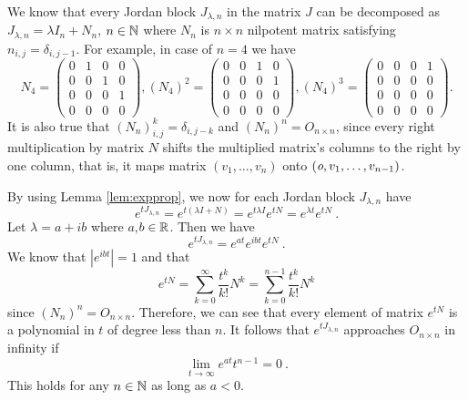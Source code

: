 We know that every Jordan block $J_{\lambda,n}$ in the matrix $J$ can be decomposed as $J_{\lambda,n}=\lambda I_n+N_n$, $n \in\mathbb{N}$ where $N_n$ is $n \times n$ nilpotent matrix satisfying $n_{i,j}=\delta_{i,j-1}$. For example, in case of $n=4$ we have
\begin{equation*}
	N_4=
	\begin{pmatrix}
		0 & 1 & 0 & 0 \\
		0 & 0 & 1 & 0 \\
		0 & 0 & 0 & 1 \\
		0 & 0 & 0 & 0 
	\end{pmatrix},
	(N_4)^2=
	\begin{pmatrix}
		0 & 0 & 1 & 0 \\
		0 & 0 & 0 & 1 \\
		0 & 0 & 0 & 0 \\
		0 & 0 & 0 & 0 
	\end{pmatrix},
	(N_4)^3=
	\begin{pmatrix}
		0 & 0 & 0 & 1 \\
		0 & 0 & 0 & 0 \\
		0 & 0 & 0 & 0 \\
		0 & 0 & 0 & 0 
	\end{pmatrix}
	.
\end{equation*}
It is also true that $(N_n)^k_{i,j}=\delta_{i,j-k}$ and $(N_n)^n=O_{n \times n}$, since every right multiplication by matrix $N$ shifts the multiplied matrix's columns to the right by one column, that is, it maps matrix $(v_1,\ldots,v_n)$ onto $(\textit{o},v_1,\ldots,v_{n-1})$. 

By using Lemma \ref{lem:expprop}, we now for each Jordan block $J_{\lambda,n}$ have
$$e^{tJ_{\lambda,n}}=e^{t(\lambda I + N)}=e^{t\lambda I}e^{tN}=e^{\lambda t}e^{tN}\ .$$
Let $\lambda = a+ib$ where $a$,$b \in \mathbb{R}$. Then we have
$$e^{tJ_{\lambda,n}}=e^{at}e^{ibt}e^{tN}\ .$$
We know that $|e^{ibt}|=1$ and that
$$e^{tN}=\sum^\infty_{k=0}\frac{t^k}{k!}N^k=\sum^{n-1}_{k=0}\frac{t^k}{k!}N^k$$
since $(N_n)^n=O_{n \times n}$. Therefore, we can see that every element of matrix $e^{tN}$ is a polynomial in $t$ of degree less than $n$. It follows that $e^{tJ_{\lambda,n}}$ approaches $O_{n \times n}$ in infinity if
$$\lim_{t\to\infty}e^{at}t^{n-1}=0\ .$$
This holds for any $n\in\mathbb{N}$ as long as $a<0$. 

